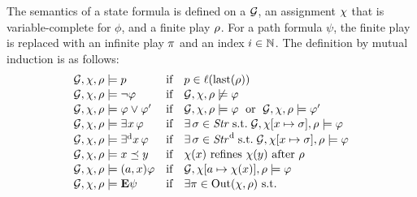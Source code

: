 \begin{definition}%
\label{def-SLi-semantics}
The semantics of a state formula is defined on a \CGS $\CGS$, an
assignment  $\chi$ that is variable-complete for $\phi$, and a
finite play $\rho$. For a path formula $\psi$, the finite play is
replaced with an infinite play $\pi$ and an index $i\in\mathbb N$. The
definition by mutual induction is as follows:
\[
\begin{array}{lcl}
 \CGS,\assign,\fplay\modelsSL p & \text{if} & p\in\val(\last(\fplay))\\[1pt]
 \CGS,\assign,\fplay\modelsSL \neg\phi & \text{if} &
  \CGS,\assign,\fplay\not\modelsSL\phi\\[1pt]
 \CGS,\assign,\fplay\modelsSL \phi\ou\phi' & \text{if} &
  \CGS,\assign,\fplay\modelsSL\phi \;\text{ or }\;
  \CGS,\assign,\fplay\modelsSL\phi' \\[1pt]
 \CGS,\assign,\fplay\modelsSL\Estratnd\phi  & \text{if} & 
\exists\,   \strat\in\setstratnd \;\text{s.t.} \;
                                                          \CGS,\assign[\var\mapsto\strat],\fplay\modelsSL
                                                          \phi\\[1pt]
   \CGS,\assign,\fplay\modelsSL\Estratd\phi  & \text{if} & 
\exists\,   \strat\in\setstratd \;\text{s.t.} \;
                                                           \CGS,\assign[\var\mapsto\strat],\fplay\modelsSL
                                                         \phi\\[1pt]
   \CGS,\assign,\fplay\modelsSL \var\refines\varb & \text{if} &
                                                              \assign(\var)
                                                              \mbox{
                                                              refines
                                                                }\assign(\varb)
  \mbox{ after }\fplay\\[1pt]
 \CGS,\assign,\fplay\modelsSL \bind{\var}\phi & \text{if} &
 \CGS,\assign[\ag\mapsto\assign(\var)],\fplay\modelsSL \phi\\[1pt]  
 \CGS,\assign,\fplay\modelsSL \Eout\psi & \text{if} & \exists\iplay \in
                                                         \out(\assign,\fplay)
                                                         \text{ s.t. }
  \\

\end{array}\]
\end{definition}
